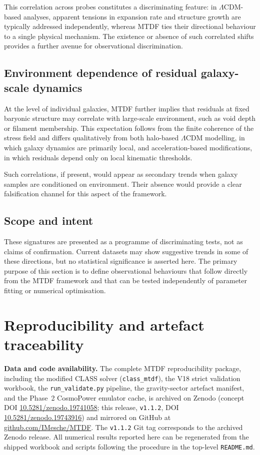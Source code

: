 \documentclass[11pt,a4paper]{article}
\begin{document}
This correlation across probes constitutes a discriminating feature: in $\Lambda$CDM-based analyses, apparent tensions in expansion rate and structure growth are typically addressed independently, whereas MTDF ties their directional behaviour to a single physical mechanism. The existence or absence of such correlated shifts provides a further avenue for observational discrimination.

\subsection{Environment dependence of residual galaxy-scale dynamics}
At the level of individual galaxies, MTDF further implies that residuals at fixed baryonic structure may correlate with large-scale environment, such as void depth or filament membership. This expectation follows from the finite coherence of the stress field and differs qualitatively from both halo-based $\Lambda$CDM modelling, in which galaxy dynamics are primarily local, and acceleration-based modifications, in which residuals depend only on local kinematic thresholds.

Such correlations, if present, would appear as secondary trends when galaxy samples are conditioned on environment. Their absence would provide a clear falsification channel for this aspect of the framework.

\subsection{Scope and intent}
These signatures are presented as a programme of discriminating tests, not as claims of confirmation. Current datasets may show suggestive trends in some of these directions, but no statistical significance is asserted here. The primary purpose of this section is to define observational behaviours that follow directly from the MTDF framework and that can be tested independently of parameter fitting or numerical optimisation.

\section{Reproducibility and artefact traceability}
\label{sec:sec11}

\textbf{Data and code availability.}
The complete MTDF reproducibility package, including the modified CLASS solver
(\texttt{class\_\allowbreak{}mtdf}), the V18 strict validation workbook, the
\texttt{run\_\allowbreak{}validate.py} pipeline, the gravity-sector artefact
manifest, and the Phase~2 CosmoPower emulator cache, is archived on Zenodo
(concept DOI \href{https://doi.org/10.5281/zenodo.19741058}{10.5281/\allowbreak{}zenodo.\allowbreak{}19741058};
this release, \texttt{v1.1.2}, DOI
\href{https://doi.org/10.5281/zenodo.19743916}{10.5281/\allowbreak{}zenodo.\allowbreak{}19743916})
and mirrored on GitHub at
\href{https://github.com/IMesche/MTDF}{github.com/\allowbreak{}IMesche/\allowbreak{}MTDF}.
The \texttt{v1.1.2} Git tag corresponds to the archived Zenodo release. All
numerical results reported here can be regenerated from the shipped workbook
and scripts following the procedure in the top-level \texttt{README.md}.
\end{document}
